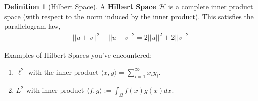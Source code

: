 \documentclass[psamsfonts]{amsart}
\theoremstyle{definition}
\newtheorem{defn}[thm]{Definition}
\theoremstyle{remark}
\numberwithin{equation}{section}
\begin{document}
\begin{defn}[Hilbert Space]
	A \textbf{Hilbert Space} \( \mathcal{H} \) is a complete inner product space (with respect to the norm induced by the inner product). This satisfies the parallelogram law, 
	\begin{align*}
		\boxed{||u+v||^2 + ||u-v||^2 = 2 ||u||^2 + 2 ||v||^2}
	\end{align*}
\end{defn}
Examples of Hilbert Spaces you've encountered:
\begin{enumerate}
	\item \( \ell^2 \) with the inner product \( \langle x, y \rangle = \sum_{i=1}^\infty x_i y_i \). 
	\item \( L^2 \) with inner product \( \langle f, g \rangle := \int_\Omega f(x) g(x) dx \).
\end{enumerate}
\end{document}
